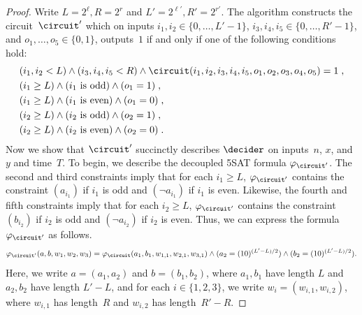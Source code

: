 \begin{proof}
  Write $L = 2^\ell, R = 2^r$ and $L' = 2^{\ell'}, R' = 2^{r'}$.
  The algorithm constructs the circuit~$\circuit'$ which on inputs $i_1, i_2 \in
  \{0, \ldots, L'-1\}$, $i_3, i_4, i_5 \in \{0, \ldots, R'-1\}$, and $o_1,
  \ldots, o_5 \in \{0, 1\}$, outputs~$1$ if and only if one of the following
  conditions hold:
  \begin{align*}
    & (i_1, i_2 < L) \land (i_3, i_4, i_5 < R) \land
      \circuit(i_1, i_2, i_3, i_4, i_5, o_1, o_2, o_3, o_4, o_5) = 1\;,\\
    & (i_1 \geq L) \land (\text{$i_1$ is odd}) \land (o_1 = 1)\;,\\
    & (i_1 \geq L) \land (\text{$i_1$ is even}) \land (o_1 = 0)\;,\\
    & (i_2 \geq L) \land (\text{$i_2$ is odd}) \land (o_2 = 1)\;,\\
    & (i_2 \geq L) \land (\text{$i_2$ is even}) \land (o_2 = 0)\;.
  \end{align*}
  Now we show that $\circuit'$ succinctly describes $\decider$ on inputs~$n$,
  $x$, and~$y$ and time~$T$.
  To begin, we describe the decoupled 5SAT formula $\varphi_{\circuit'}$.
  The second and third constraints imply that for each $i_1 \geq L$,
  $\varphi_{\circuit'}$ contains the constraint $(a_{i_1})$ if $i_1$ is odd and
  $(\neg a_{i_1})$ if $i_1$ is even.
  Likewise, the fourth and fifth constraints imply that for each $i_2 \geq L$,
  $\varphi_{\circuit'}$ contains the constraint $(b_{i_2})$ if $i_2$ is odd and
  $(\neg a_{i_2})$ if $i_2$ is even.
  Thus, we can express the formula $\varphi_{\circuit'}$ as follows.
  \begin{equation}\label{eq:write-formula}
    \varphi_{\circuit'}(a, b, w_1, w_2, w_3)
    = \varphi_{\circuit}(a_1, b_1, w_{1, 1}, w_{2, 1} ,w_{3, 1})
  	\land (a_2 = (10)^{(L'-L)/2}) \land (b_2 = (10)^{(L'-L)/2}).
  \end{equation}
  Here, we write $a = (a_1, a_2)$ and $b = (b_1, b_2)$, where $a_1, b_1$ have
  length $L$ and $a_2, b_2$ have length $L' - L$, and for each $i \in \{1, 2,
  3\}$, we write $w_i = (w_{i, 1}, w_{i, 2})$, where $w_{i, 1}$ has length~$R$
  and $w_{i, 2}$ has length~$R'-R$.
  

\end{proof}
